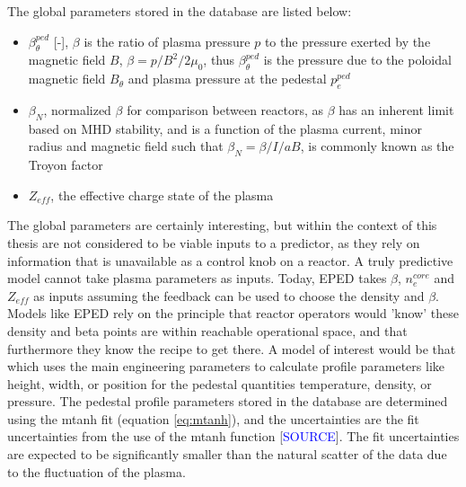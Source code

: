 \documentclass[a4paper, twoside, final, 12pt]{article}
\begin{document}
The global parameters stored in the database are listed below: 
\begin{itemize}
	\item $\beta_\theta^{ped}$ [-], $\beta$ is the ratio of plasma pressure $p$ to the pressure exerted by the magnetic field $B$, $\beta = p / B^2 / 2\mu_0$, thus $\beta_\theta^{ped}$ is the pressure due to the poloidal magnetic field $B_\theta$ and plasma pressure at the pedestal $p_e^{ped}$
	\item $\beta_N$, normalized $\beta$ for comparison between reactors, as $\beta$ has an inherent limit based on MHD stability, and is a function of the plasma current, minor radius and magnetic field such that $\beta_N = \beta / I / aB$, is commonly known as the Troyon factor
	\item $Z_{eff}$, the effective charge state of the plasma
\end{itemize}

The global parameters are certainly interesting, but within the context of this thesis are not considered to be viable inputs to a predictor, as they rely on information that is unavailable as a control knob on a reactor.
A truly predictive model cannot take plasma parameters as inputs. Today, EPED takes $\beta$, $n_e^{core}$ and $Z_{eff}$ as inputs assuming the feedback can be used to choose the density and $\beta$.
Models like EPED rely on the principle that reactor operators would 'know' these density and beta points are within reachable operational space, and that furthermore they know the recipe to get there.
A model of interest would be that which uses the main engineering parameters to calculate profile parameters like height, width, or position for the pedestal quantities temperature, density, or pressure.
The pedestal profile parameters stored in the database are determined using the mtanh fit (equation \ref{eq:mtanh}), and the uncertainties are the fit uncertainties from the use of the mtanh function [\textcolor{blue}{SOURCE}].
The fit uncertainties are expected to be significantly smaller than the natural scatter of the data due to the fluctuation of the plasma.
\end{document}

